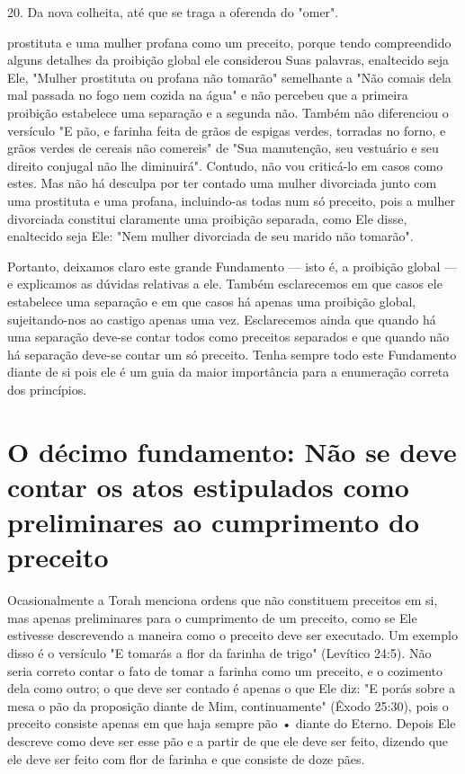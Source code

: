 \begin{itemize}
\begin{enumrate}
20. Da nova colheita, até que se traga a oferenda do "omer".

prostituta e uma mulher profana como um preceito, porque tendo
compreen­dido alguns detalhes da proibição global ele considerou Suas
palavras, enalteci­do seja Ele, "Mulher prostituta ou profana não
tomarão" semelhante a "Não comais dela mal passada no fogo nem cozida na
água" e não percebeu que a primeira proibição estabelece uma separação e
a segunda não. Também não di­ferenciou o versículo "E pão, e farinha
feita de grãos de espigas verdes, torra­das no forno, e grãos verdes de
cereais não comereis" de "Sua manutenção, seu vestuário e seu direito
conjugal não lhe diminuirá". Contudo, não vou cri­ticá-lo em casos como
estes. Mas não há desculpa por ter contado uma mulher divorciada junto
com uma prostituta e uma profana, incluindo-as todas num só preceito,
pois a mulher divorciada constitui claramente uma proibição sepa­rada,
como Ele disse, enaltecido seja Ele: "Nem mulher divorciada de seu
mari­do não tomarão".

Portanto, deixamos claro este grande Fundamento --- isto é, a proi­bição
global --- e explicamos as dúvidas relativas a ele. Também esclarecemos
em que casos ele estabelece uma separação e em que casos há apenas uma
proi­bição global, sujeitando-nos ao castigo apenas uma vez.
Esclarecemos ainda que quando há uma separação deve-se contar todos como
preceitos separados e que quando não há separação deve-se contar um só
preceito. Tenha sempre todo este Fundamento diante de si pois ele é um
guia da maior importância para a enumeração correta dos princípios.

\chapter{O décimo fundamento: Não se deve contar os atos estipulados como preliminares ao cumprimento do preceito}

Ocasionalmente a Torah menciona ordens que não constituem pre­ceitos em
si, mas apenas preliminares para o cumprimento de um preceito, co­mo se
Ele estivesse descrevendo a maneira como o preceito deve ser executa­do.
Um exemplo disso é o versículo "E tomarás a flor da farinha de trigo"
(Le­vítico 24:5). Não seria correto contar o fato de tomar a farinha
como um pre­ceito, e o cozimento dela como outro; o que deve ser contado
é apenas o que Ele diz: "E porás sobre a mesa o pão da proposição diante
de Mim, continua­mente" (Êxodo 25:30), pois o preceito consiste apenas
em que haja sempre pão • diante do Eterno. Depois Ele descreve como deve
ser esse pão e a partir de que ele deve ser feito, dizendo que ele deve
ser feito com flor de farinha e que consiste de doze pães.


\end{enumrate}
\end{itemize}
